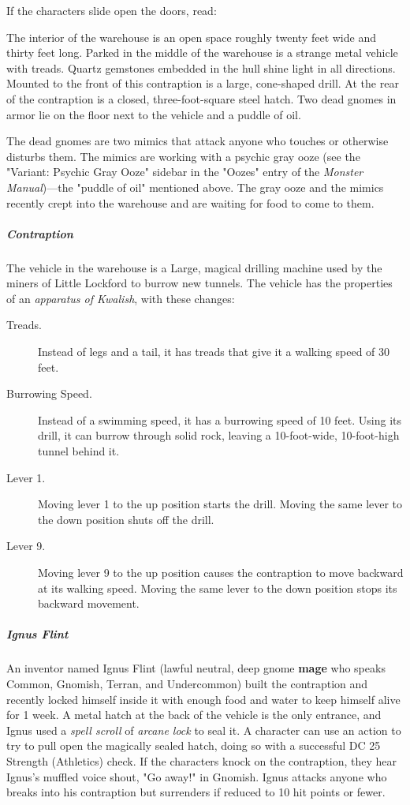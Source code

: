 \documentclass[10pt,a4paper,twoside,bg=print,twocolumn,openany,nodeprecatedcode]{dndbook}
\begin{document}
If the characters slide open the doors, read:

\begin{DndReadAloud}{}
The interior of the warehouse is an open space roughly twenty feet wide and thirty feet long. Parked in the middle of the warehouse is a strange metal vehicle with treads. Quartz gemstones embedded in the hull shine light in all directions. Mounted to the front of this contraption is a large, cone-shaped drill. At the rear of the contraption is a closed, three-foot-square steel hatch. Two dead gnomes in armor lie on the floor next to the vehicle and a puddle of oil.

\end{DndReadAloud}

The dead gnomes are two mimics that attack anyone who touches or otherwise disturbs them. The mimics are working with a psychic gray ooze (see the "Variant: Psychic Gray Ooze" sidebar in the "Oozes" entry of the \textit{Monster Manual})—the "puddle of oil" mentioned above. The gray ooze and the mimics recently crept into the warehouse and are waiting for food to come to them.

\subparagraph{Contraption}
The vehicle in the warehouse is a Large, magical drilling machine used by the miners of Little Lockford to burrow new tunnels. The vehicle has the properties of an \textit{apparatus of Kwalish}, with these changes:


\begin{description}
\item[Treads.]
Instead of legs and a tail, it has treads that give it a walking speed of 30 feet.
\item[Burrowing Speed.]
Instead of a swimming speed, it has a burrowing speed of 10 feet. Using its drill, it can burrow through solid rock, leaving a 10-foot-wide, 10-foot-high tunnel behind it.
\item[Lever 1.]
Moving lever 1 to the up position starts the drill. Moving the same lever to the down position shuts off the drill.
\item[Lever 9.]
Moving lever 9 to the up position causes the contraption to move backward at its walking speed. Moving the same lever to the down position stops its backward movement.
\end{description}

\subparagraph{Ignus Flint}
An inventor named Ignus Flint (lawful neutral, deep gnome \textbf{mage} who speaks Common, Gnomish, Terran, and Undercommon) built the contraption and recently locked himself inside it with enough food and water to keep himself alive for 1 week. A metal hatch at the back of the vehicle is the only entrance, and Ignus used a \textit{spell scroll} of \textit{arcane lock} to seal it. A character can use an action to try to pull open the magically sealed hatch, doing so with a successful DC 25 Strength (Athletics) check. If the characters knock on the contraption, they hear Ignus's muffled voice shout, "Go away!" in Gnomish. Ignus attacks anyone who breaks into his contraption but surrenders if reduced to 10 hit points or fewer.
\end{document}
